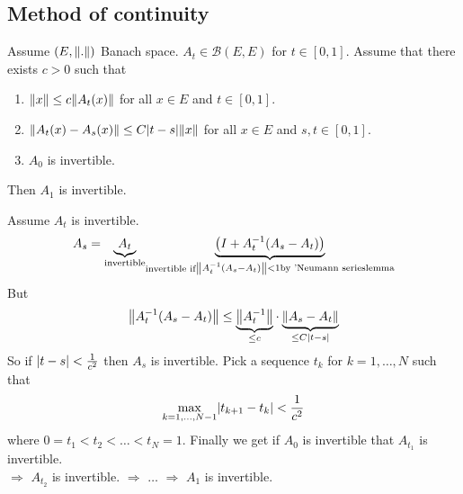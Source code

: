 \subsection{Method of continuity} 
\label{sub:method_of_continuity}
\begin{theorem}
	Assume $(E,\norm{.})$ Banach space. $A_t \in \mathcal{B}(E,E)$ for $t \in [0,1]$. Assume that there exists $c>0$ such that
	\begin{enumerate}
		\item $\norm{x} \leq c \norm{A_t(x)}$ for all $x \in E$ and $t \in [0,1]$.
		\item $\norm{A_t(x)-A_s(x)} \leq C \abs{t-s} \norm{x}$ for all $x \in E$ and $s,t \in [0,1]$.
		\item $A_0$ is invertible. 
	\end{enumerate}

	Then $A_1$ is invertible.
\end{theorem}

\begin{beweis}
	Assume $A_t$ is invertible. 
	\[
		A_s = \underset{\text{invertible}}{\underbrace{A_t}} \underset{\substack{\text{invertible if}} \\ \norm{A^{-1}_t (A_s - A_t)}< 1 \\ \text{by 'Neumann series} \\ \text{lemma}}{\underbrace{\left( I + A_t^{-1} ( A_s - A_t) \right)}}
	\]
	But \[
		\norm{A^{-1}_t (A_s- A_t)} \leq \underset{\leq c}{\underbrace{\norm{A_t^{-1}}}} \cdot \underset{\leq C \abs{t-s}}{\underbrace{ \norm{A_s-A_t}}}
	\]
	So if $\lvert t-s\rvert < \frac{1}{c^2}$ then $A_s$ is invertible. Pick a sequence $t_k$ for $k=1,\dots,N$ such that
	\[
		\max_{k =1,\dots,N-1} \lvert t_{k+1}-t_k\rvert < \frac{1}{c^2}
	\]
	where $0 = t_1 < t_2 < \dots < t_N=1$. Finally we get if $A_0$ is invertible that $A_{t_1}$ is invertible. \\
	$\Rightarrow $ $A_{t_2}$ is invertible. $\Rightarrow $ $\dots$ $\Rightarrow $ $A_1$ is invertible.
\end{beweis}

